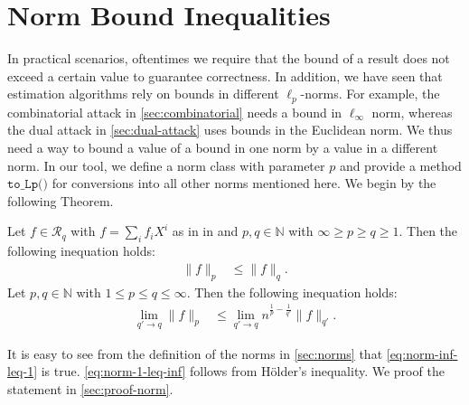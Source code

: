\section{Norm Bound Inequalities} \label{sec:norm-bounds}%
In practical scenarios, oftentimes we require that the bound of a result does not exceed a certain value to guarantee correctness. In addition, we have seen that estimation algorithms rely on bounds in different $\ell_p$-norms. For example, the combinatorial attack in \cref{sec:combinatorial} needs a bound in $\ell_\infty$ norm, whereas the dual attack in \cref{sec:dual-attack} uses bounds in the Euclidean norm. We thus need a way to bound a value of a bound in one norm by a value in a different norm. In our tool, we define a norm class with parameter $p$ and provide a  method $\texttt{to\_Lp()}$ for conversions into all other norms mentioned here. We begin by the following Theorem.
\begin{theorem}\label{th:norm-rel1}
    Let $f \in \mathcal{R}_q$ with $f = \sum_i f_i X^i$ as in in \cite{BDLOP18} and $p, q \in \mathbb{N}$ with $\infty \geq p \geq q \geq 1$. Then the following inequation holds:
    \begin{align}
        \| f \|_p & \leq \| f \|_q \label{eq:norm-inf-leq-1}.
    \end{align}
    Let $p, q \in \mathbb{N}$ with $1 \leq p \leq q \leq \infty$. Then the following inequation holds:
    \begin{align}
        \lim_{q' \rightarrow q}\| f \|_p & \leq \lim_{q' \rightarrow q} n^{\frac{1}{p} - \frac{1}{q'}}\| f \|_{q'} \label{eq:norm-1-leq-inf}.
    \end{align}
\end{theorem}
It is easy to see from the definition of the norms in \cref{sec:norms} that \cref{eq:norm-inf-leq-1} is true. \cref{eq:norm-1-leq-inf} follows from Hölder's inequality. We proof the statement in \cref{sec:proof-norm}.

